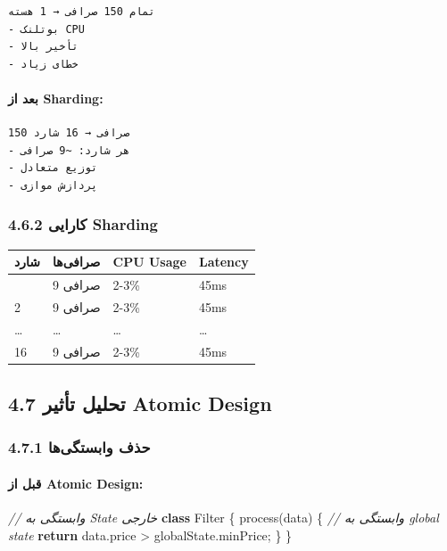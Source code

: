 \documentclass[
]{article}
\newenvironment{Shaded}{}{}
\newcommand{\AttributeTok}[1]{\textcolor[rgb]{0.49,0.56,0.16}{#1}}
\newcommand{\BuiltInTok}[1]{\textcolor[rgb]{0.00,0.50,0.00}{#1}}
\newcommand{\CommentTok}[1]{\textcolor[rgb]{0.38,0.63,0.69}{\textit{#1}}}
\newcommand{\ControlFlowTok}[1]{\textcolor[rgb]{0.00,0.44,0.13}{\textbf{#1}}}
\newcommand{\KeywordTok}[1]{\textcolor[rgb]{0.00,0.44,0.13}{\textbf{#1}}}
\newcommand{\NormalTok}[1]{#1}
\newcommand{\OperatorTok}[1]{\textcolor[rgb]{0.40,0.40,0.40}{#1}}
\newcounter{none} %
\begin{document}
\begin{verbatim}
تمام 150 صرافی → 1 هسته
- بوتلنک CPU
- تأخیر بالا
- خطای زیاد
\end{verbatim}

\paragraph{بعد از Sharding:}\label{ux628ux639ux62f-ux627ux632-sharding}

\begin{verbatim}
150 صرافی → 16 شارد
- هر شارد: ~9 صرافی
- توزیع متعادل
- پردازش موازی
\end{verbatim}

\subsubsection{4.6.2 کارایی
Sharding}\label{ux6a9ux627ux631ux627ux6ccux6cc-sharding}

{\def\LTcaptype{none} %
\begin{longtable}[]{@{}llll@{}}
\toprule\noalign{}
شارد & صرافی‌ها & CPU Usage & Latency \\
\midrule\noalign{}
\endhead
\bottomrule\noalign{}
\endlastfoot
1 & 9 صرافی & 2-3\% & 45ms \\
2 & 9 صرافی & 2-3\% & 45ms \\
\ldots{} & \ldots{} & \ldots{} & \ldots{} \\
16 & 9 صرافی & 2-3\% & 45ms \\
\end{longtable}
}

\subsection{4.7 تحلیل تأثیر Atomic
Design}\label{ux62aux62dux644ux6ccux644-ux62aux623ux62bux6ccux631-atomic-design}

\subsubsection{4.7.1 حذف
وابستگی‌ها}\label{ux62dux630ux641-ux648ux627ux628ux633ux62aux6afux6ccux647ux627}

\paragraph{قبل از Atomic
Design:}\label{ux642ux628ux644-ux627ux632-atomic-design}

\begin{Shaded}
\begin{Highlighting}[]
\CommentTok{// وابستگی به State خارجی}
\KeywordTok{class}\NormalTok{ Filter \{}
  \BuiltInTok{process}\NormalTok{(data) \{}
    \CommentTok{// وابستگی به global state}
    \ControlFlowTok{return}\NormalTok{ data}\OperatorTok{.}\AttributeTok{price} \OperatorTok{\textgreater{}}\NormalTok{ globalState}\OperatorTok{.}\AttributeTok{minPrice}\OperatorTok{;}
\NormalTok{  \}}
\NormalTok{\}}
\end{Highlighting}
\end{Shaded}
\end{document}

